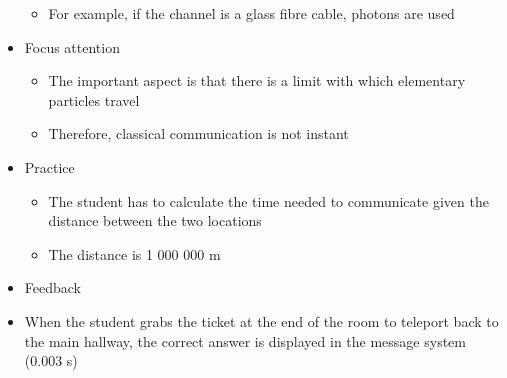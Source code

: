 \documentclass[11pt,twoside]{report} %
\begin{document}
\begin{itemize}
\begin{itemize}
		\item For example, if the channel is a glass fibre cable, photons are used
	\end{itemize}
	\item Focus attention
	\begin{itemize}
		\item The important aspect is that there is a limit with which elementary particles travel
		\item Therefore, classical communication is not instant
	\end{itemize}			
	\item Practice
	\begin{itemize}
		\item The student has to calculate the time needed to communicate given the distance between the two locations
		\item The distance is 1 000 000 m
	\end{itemize}
	\item Feedback
		\item When the student grabs the ticket at the end of the room to teleport back to the main hallway, the correct answer is displayed in the message system (0.003 s)
\end{itemize}
\end{document}

